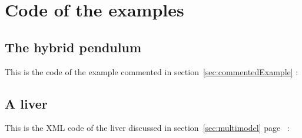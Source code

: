 \section{Code of the examples}
\subsection{The hybrid pendulum}\label{cpp:hybrid}
This is the code of the example commented in section~\ref{sec:commentedExample} :

\subsection{A liver}\label{xml:liver}
This is the XML code of the liver discussed in section~\ref{sec:multimodel} page~\pageref{bla:liver} :


% 
% 
% 
% 
% 
% 
% 








